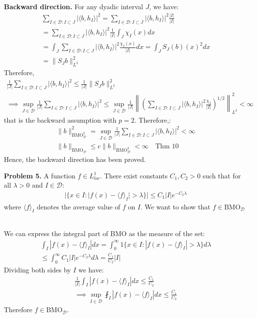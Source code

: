 \documentclass{article}
\newcommand{\D}{\mathcal{D}}
\newcommand{\bmo}{\text{BMO}}
\begin{document}
\textbf{Backward direction. } For any dyadic interval $J$, we have:
\begin{gather*}
    \sum_{I \in \D: I \subset J} |\langle b, h_I \rangle|^2 = \sum_{I \in \D: I \subset J} |\langle b, h_I \rangle|^2 \frac{|I|}{|I|}\\
    = \sum_{I \in \D: I \subset J} |\langle b, h_I \rangle|^2 \frac{1}{|I|} \int_J \chi_I(x) dx\\
    = \int_J \sum_{I \in \D: I \subset J} |\langle b, h_I \rangle|^2 \frac{\chi_I(x)}{|I|} dx = \int_J S_J(b)(x)^2 dx\\
    = \lVert S_J b \rVert_{L^2}^2
\end{gather*}
Therefore,
\begin{gather*}
    \frac{1}{|J|} \sum_{I \in \D: I \subset J} |\langle b, h_I \rangle|^2 \leq \frac{1}{|J|} \lVert S_J b \rVert_{L^2}^2\\
    \implies \sup_{J\in \D} \frac{1}{|J|} \sum_{I \in \D: I \subset J} |\langle b, h_I \rangle|^2 \leq \sup_{J \in \D} \frac{1}{|J|} \left\lVert \left( \sum_{I \in \D: I \subset J} |\langle b, h_I \rangle|^2 \frac{\chi_I}{|I|} \right)^{1/2} \right\rVert_{L^2}^2 < \infty
\end{gather*}
that is the backward assumption with $p = 2$. Therefore,:
\begin{gather*}
    \lVert b \rVert_{\bmo_{\D}^2}^2 = \sup_{J\in \D} \frac{1}{|J|} \sum_{I \in \D: I \subset J} |\langle b, h_I \rangle|^2 < \infty \\
    \lVert b \rVert_{\bmo_{\D}} \leq c \lVert b \rVert_{\bmo_{\D}^2} < \infty \quad \text{Thm 10}
\end{gather*}
Hence, the backward direction has been proved.
\clearpage


\textbf{Problem 5. } A function $f \in L_{loc}^1$. There exist constants $C_1,C_2 > 0$ such that for all $\lambda > 0$ and $I \in \D$:
\begin{gather*}
  | \{ x \in I : |f(x) - \langle f \rangle_I| > \lambda \} | \leq C_1 |I| e^{-C_2 \lambda}
\end{gather*}
where $\langle f \rangle_I$ denotes the average value of $f$ on $I$. We want to show that $f \in \bmo_{\D}$
\\~

We can express the integral part of BMO as the measure of the set:
\begin{gather*}
    \int_I |f(x) - \langle f \rangle_I| dx = \int_0^{\infty} 1\{ x \in I : |f(x) - \langle f \rangle_I| > \lambda \} d\lambda\\
    \leq \int_{0}^{\infty} C_1 |I| e^{-C_2 \lambda} d\lambda = \frac{C_1}{C_2} |I|
\end{gather*}
Dividing both sides by $I$ we have:
\begin{gather*}
    \frac{1}{|I|} \int_I |f(x) - \langle f \rangle_I| dx \leq \frac{C_1}{C_2} \\
    \implies \sup_{I \in \D}  \fint_I |f(x) - \langle f \rangle_I| dx \leq \frac{C_1}{C_2}
\end{gather*}
Therefore $f \in \bmo_{\D}$.
\\~
\end{document}
